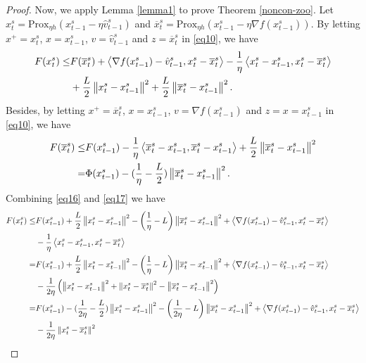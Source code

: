 \documentclass{article}
\newcommand*{\Po}{\text{Prox}}
\newcommand{\norm}[1]{\left\lVert#1\right\rVert}
\newcommand{\Iprod}[2]{\left\langle #1,#2\right\rangle}
\theoremstyle{definition}
\theoremstyle{remark}
\begin{document}
\begin{proof}
Now, we apply Lemma \ref{lemma1} to prove Theorem \ref{noncon-zoo}. Let $x_t^s = \Po_{\eta h} (x_{t-1}^s - \eta \hat{v}_{t-1}^s)$ and $\overline{x}_t^s = \Po_{\eta h} (x_{t-1}^s - \eta \nabla f(x_{t-1}^s))$. By letting $x^+ = x_t^s$, $x = x_{t-1}^s$, $v = \hat{v}_{t-1}^s$ and $z = \overline{x}_t^s$ in \eqref{eq10}, we have
\begin{align}
F(x^s_t) \leq& F(\overline{x}_t^s) + \Iprod{\nabla f(x_{t-1}^s)-\hat{v}_{t-1}^s}{x_t^s-\overline{x}_t^s}-\frac{1}{\eta} \Iprod{x_t^s-x_{t-1}^s}{x_t^s-\overline{x}_t^s}\notag\\
&+\frac{L}{2}\norm{x_t^s-x_{t-1}^s}^2+\frac{L}{2}\norm{\overline{x}_t^s-x_{t-1}^s}^2.\label{eq16}
\end{align}
Besides, by letting $x^+ = \overline{x}_t^s$, $x = x_{t-1}^s$, $v = \nabla f(x_{t-1}^s)$ and $z = x = {x}_{t-1}^s$ in \eqref{eq10}, we have
\begin{align}
F(\overline{x}_t^s) \leq& F({x}_{t-1}^s) - \frac{1}{\eta}\Iprod{\overline{x}_t^s-x_{t-1}^s}{\overline{x}_t^s - x_{t-1}^s}+\frac{L}{2}\norm{\overline{x}_t^s-x_{t-1}^s}^2\notag\\
 =& \Phi({x}_{t-1}^s) -(\frac{1}{\eta}-\frac{L}{2})\norm{\overline{x}_t^s-x_{t-1}^s}^2.\label{eq17} 
\end{align}
Combining \eqref{eq16} and \eqref{eq17} we have 
 \begin{align}
 F({x}_t^s) \leq& F({x}_{t-1}^s) +\frac{L}{2}\norm{{x}_t^s-x_{t-1}^s}^2 - \left(\frac{1}{\eta}-L\right)\norm{\overline{x}_t^s-x_{t-1}^s}^2+\Iprod{\nabla f(x_{t-1}^s)-\hat{v}_{t-1}^s}{x_t^s - \overline{x}_t^s}\notag\\
 & -\frac{1}{\eta} \Iprod{x_t^s-x_{t-1}^s}{x_t^s-\overline{x}_{t}^s}\notag\\
  =& F({x}_{t-1}^s)  +\frac{L}{2}\norm{{x}_t^s-x_{t-1}^s}^2- \left(\frac{1}{\eta}-L\right)\norm{\overline{x}_t^s-x_{t-1}^s}^2+\Iprod{\nabla f(x_{t-1}^s)-\hat{v}_{t-1}^s}{x_t^s - \overline{x}_t^s}\notag\\
 &-\frac{1}{2\eta} \left(\norm{x_t^s-x_{t-1}^s}^2+ \norm{x_t^s-\overline{x}_{t}^s}^2-\norm{\overline{x}_{t}^s-x_{t-1}^s}^2\right)\notag\\
   =& F({x}_{t-1}^s)  -(\frac{1}{2\eta} - \frac{L}{2})\norm{{x}_t^s-x_{t-1}^s}^2- \left(\frac{1}{2\eta}-L\right)\norm{\overline{x}_t^s-x_{t-1}^s}^2+\Iprod{\nabla f(x_{t-1}^s)-\hat{v}_{t-1}^s}{x_t^s - \overline{x}_t^s}\notag\\
 & -\frac{1}{2\eta} \norm{x_t^s-\overline{x}_{t}^s}^2\notag\\

\end{align}
\end{proof}
\end{document}
